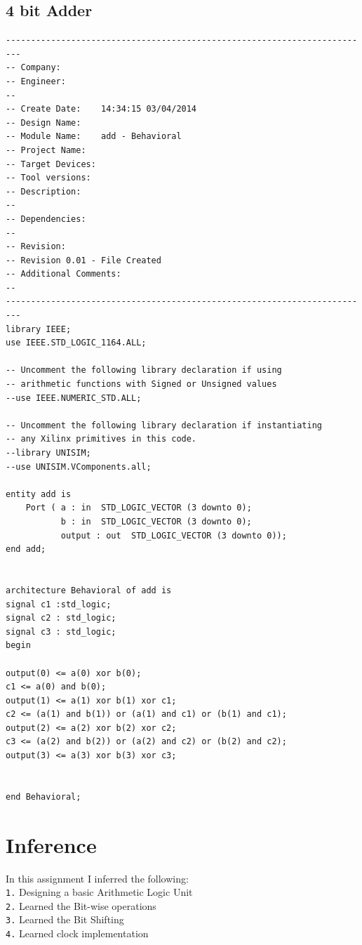 \documentclass[12pt]{article}
\begin{document}
\subsection{4 bit Adder}
\begin{lstlisting}[style=vhdl]
-------------------------------------------------------------------------
-- Company: 
-- Engineer: 
-- 
-- Create Date:    14:34:15 03/04/2014 
-- Design Name: 
-- Module Name:    add - Behavioral 
-- Project Name: 
-- Target Devices: 
-- Tool versions: 
-- Description: 
--
-- Dependencies: 
--
-- Revision: 
-- Revision 0.01 - File Created
-- Additional Comments: 
--
-------------------------------------------------------------------------
library IEEE;
use IEEE.STD_LOGIC_1164.ALL;

-- Uncomment the following library declaration if using
-- arithmetic functions with Signed or Unsigned values
--use IEEE.NUMERIC_STD.ALL;

-- Uncomment the following library declaration if instantiating
-- any Xilinx primitives in this code.
--library UNISIM;
--use UNISIM.VComponents.all;

entity add is
    Port ( a : in  STD_LOGIC_VECTOR (3 downto 0);
           b : in  STD_LOGIC_VECTOR (3 downto 0);
           output : out  STD_LOGIC_VECTOR (3 downto 0));
end add;


architecture Behavioral of add is
signal c1 :std_logic;
signal c2 : std_logic;
signal c3 : std_logic;
begin

output(0) <= a(0) xor b(0);
c1 <= a(0) and b(0);
output(1) <= a(1) xor b(1) xor c1;
c2 <= (a(1) and b(1)) or (a(1) and c1) or (b(1) and c1);
output(2) <= a(2) xor b(2) xor c2;
c3 <= (a(2) and b(2)) or (a(2) and c2) or (b(2) and c2);
output(3) <= a(3) xor b(3) xor c3;


end Behavioral;

\end{lstlisting}

\section{Inference}
In this assignment I inferred the following:\\
\verb|1.| Designing a basic Arithmetic Logic Unit\\
\verb|2.| Learned the Bit-wise operations  \\
\verb|3.| Learned the Bit Shifting \\
\verb|4.| Learned clock implementation \\
\end{document}
